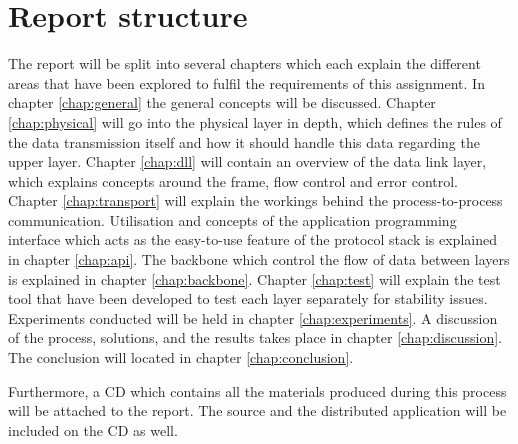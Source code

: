 \section{Report structure}
The report will be split into several chapters which each explain the different areas that have been explored to fulfil the requirements of this assignment. In chapter \ref{chap:general} the general concepts will be discussed. Chapter \ref{chap:physical} will go into the physical layer in depth, which defines the rules of the data transmission itself and how it should handle this data regarding the upper layer. Chapter \ref{chap:dll} will contain an overview of the data link layer, which explains concepts around the frame, flow control and error control. Chapter \ref{chap:transport} will explain the workings behind the process-to-process communication. Utilisation and concepts of the application programming interface which acts as the easy-to-use feature of the protocol stack is explained in chapter \ref{chap:api}. The backbone which control the flow of data between layers is explained in chapter \ref{chap:backbone}. Chapter \ref{chap:test} will explain the test tool that have been developed to test each layer separately for stability issues. Experiments conducted will be held in chapter \ref{chap:experiments}. A discussion of the process, solutions, and the results takes place in chapter \ref{chap:discussion}. The conclusion will located in chapter \ref{chap:conclusion}.

Furthermore, a CD which contains all the materials produced during this process will be attached to the report. The source and the distributed application will be included on the CD as well.